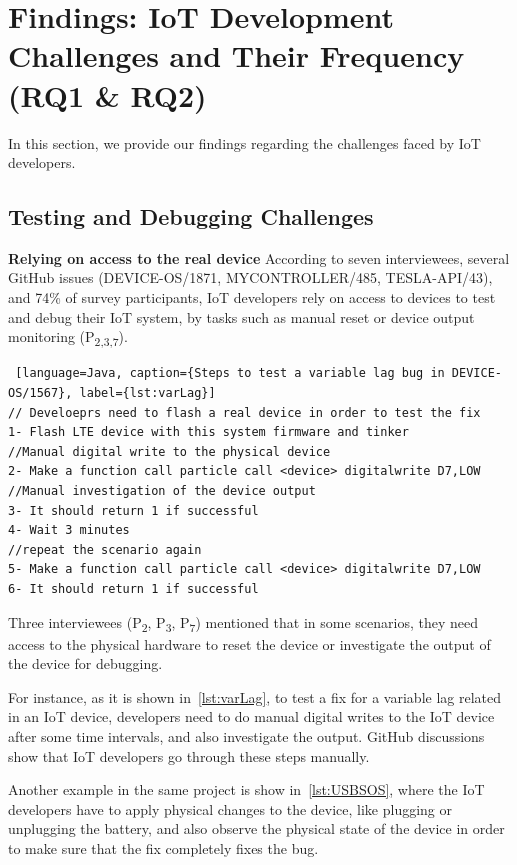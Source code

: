 {\section{Findings: IoT Development Challenges and Their Frequency (RQ1 \& RQ2)}
In this section, we provide our findings regarding the challenges faced by IoT developers.

\subsection{Testing and Debugging Challenges}
\textbf{Relying on access to the real device}
According to seven interviewees, several GitHub issues (DEVICE-OS/1871, MYCONTROLLER/485, TESLA-API/43), and 74\% of survey participants, IoT developers rely on access to devices to test and debug their IoT system, by tasks such as manual reset or device output monitoring (P\textsubscript{2,3,7}).

\begin{lstlisting} [language=Java, caption={Steps to test a variable lag bug in DEVICE-OS/1567}, label={lst:varLag}] 
// Develoeprs need to flash a real device in order to test the fix
1- Flash LTE device with this system firmware and tinker
//Manual digital write to the physical device
2- Make a function call particle call <device> digitalwrite D7,LOW 
//Manual investigation of the device output
3- It should return 1 if successful   
4- Wait 3 minutes 
//repeat the scenario again
5- Make a function call particle call <device> digitalwrite D7,LOW
6- It should return 1 if successful 
\end{lstlisting}



Three interviewees (P\textsubscript{2}, P\textsubscript{3}, P\textsubscript{7}) mentioned that in some scenarios, they need access to the physical hardware to reset the device or investigate the output of the device for debugging.

 For instance, as it is shown in~\autoref{lst:varLag}, to test a fix for a variable lag related in an IoT device, developers need to do manual digital writes to the IoT device after some time intervals, and also investigate the output. GitHub discussions show that IoT developers go through these steps manually.
 
 Another example in the same project is show in~\autoref{lst:USBSOS}, where the IoT developers have to apply physical changes to the device, like plugging or unplugging the battery, and also observe the physical state of the device in order to make sure that the fix completely fixes the bug. 


}
